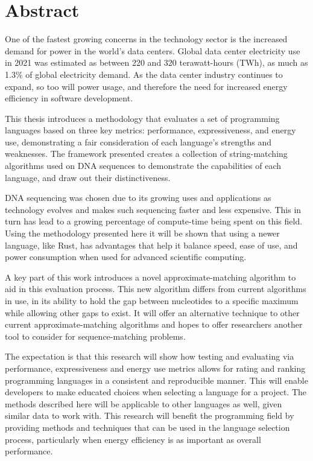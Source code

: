 \section*{Abstract}

One of the fastest growing concerns in the technology sector is the increased demand for power in the world's data centers. Global data center electricity use in 2021 was estimated as between 220 and 320 terawatt-hours (TWh), as much as 1.3\% of global electricity demand. As the data center industry continues to expand, so too will power usage, and therefore the need for increased energy efficiency in software development.

This thesis introduces a methodology that evaluates a set of programming languages based on three key metrics: performance, expressiveness, and energy use, demonstrating a fair consideration of each language's strengths and weaknesses. The framework presented creates a collection of string-matching algorithms used on DNA sequences to demonstrate the capabilities of each language, and draw out their distinctiveness.

DNA sequencing was chosen due to its growing uses and applications as technology evolves and makes such sequencing faster and less expensive. This in turn has lead to a growing percentage of compute-time being spent on this field. Using the methodology presented here it will be shown that using a newer language, like Rust, has advantages that help it balance speed, ease of use, and power consumption when used for advanced scientific computing.

A key part of this work introduces a novel approximate-matching algorithm to aid in this evaluation process. This new algorithm differs from current algorithms in use, in its ability to hold the gap between nucleotides to a specific maximum while allowing other gaps to exist. It will offer an alternative technique to other current approximate-matching algorithms and hopes to offer researchers another tool to consider for sequence-matching problems.

The expectation is that this research will show how testing and evaluating via performance, expressiveness and energy use metrics allows for rating and ranking programming languages in a consistent and reproducible manner. This will enable developers to make educated choices when selecting a language for a project. The methods described here will be applicable to other languages as well, given similar data to work with. This research will benefit the programming field by providing methods and techniques that can be used in the language selection process, particularly when energy efficiency is as important as overall performance.

